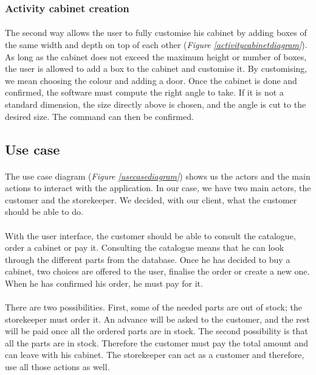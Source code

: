 \documentclass[12pt,oneside]{report}
\begin{document}
    \subsubsection{Activity cabinet creation}
        \paragraph{}
        The second way allows the user to fully customise his cabinet by adding boxes of the same width and depth on top of each other (\textit{Figure \ref{activitycabinetdiagram}}). As long as the cabinet does not exceed the maximum height or number of boxes, the user is allowed to add a box to the cabinet and customise it. By customising, we mean choosing the colour and adding a door. Once the cabinet is done and confirmed, the software must compute the right angle to take. If it is not a standard dimension, the size directly above is chosen, and the angle is cut to the desired size. The command can then be confirmed.
    \newpage
    
    \subsection{Use case}
        \paragraph{}
        The use case diagram (\textit{Figure \ref{usecasediagram}}) shows us the actors and the main actions to interact with the application. In our case, we have two main actors, the customer and the storekeeper. We decided, with our client, what the customer should be able to do. 
        
        \paragraph{}
        With the user interface, the customer should be able to consult the catalogue, order a cabinet or pay it. Consulting the catalogue means that he can look through the different parts from the database. Once he has decided to buy a cabinet, two choices are offered to the user, finalise the order or create a new one. When he has confirmed his order, he must pay for it. 
        
        \paragraph{}
        There are two possibilities. First, some of the needed parts are out of stock; the storekeeper must order it. An advance will be asked to the customer, and the rest will be paid once all the ordered parts are in stock. The second possibility is that all the parts are in stock. Therefore the customer must pay the total amount and can leave with his cabinet. The storekeeper can act as a customer and therefore, use all those actions as well.
        
\end{document}
